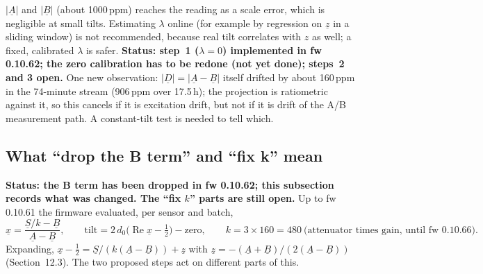 \documentclass[11pt,a4paper]{article}
\begin{document}
$|\underline{A}|$ and $|\underline{B}|$ (about 1000\,ppm) reaches the reading as
a scale error, which is negligible at small tilts.  Estimating $\lambda$
online (for example by regression on $\underline{z}$ in a sliding window) is
not recommended, because real tilt correlates with $z$ as well; a fixed,
calibrated $\lambda$ is safer.  \textbf{Status: step~1 ($\lambda=0$) implemented
in fw 0.10.62; the zero calibration has to be redone (not yet done); steps~2
and 3 open.}  One new observation: $|\underline{D}|=|\underline{A}-\underline{B}|$
itself drifted by about 160\,ppm in the 74-minute stream (906\,ppm over
17.5\,h); the projection is ratiometric against it, so this cancels if it is
excitation drift, but not if it is drift of the A/B measurement path.  A
constant-tilt test is needed to tell which.

\subsection{What ``drop the B term'' and ``fix k'' mean}

\textbf{Status: the B term has been dropped in fw 0.10.62; this subsection
records what was changed.  The ``fix $k$'' parts are still open.}  Up to fw
0.10.61 the firmware evaluated, per sensor and batch,
\begin{equation}
  \underline{x} = \frac{\underline{S}/k - \underline{B}}{\underline{A}-\underline{B}},
  \qquad \text{tilt} = 2\,d_0\bigl(\operatorname{Re}\underline{x}-\tfrac12\bigr) - \text{zero},
  \qquad k = 3\times160 = 480\ \text{(attenuator times gain, until fw 0.10.66)} .
\end{equation}
Expanding, $\underline{x}-\tfrac12 = \underline{S}/(k(\underline{A}-\underline{B})) + \underline{z}$
with $\underline{z}=-(\underline{A}+\underline{B})/(2(\underline{A}-\underline{B}))$
(Section~12.3).  The two proposed steps act on different parts of this.
\end{document}
